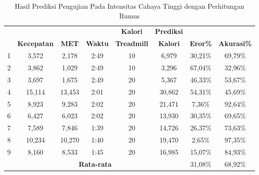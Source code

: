 \begin{longtable}{|c|c|c|c|c|c|c|c|}
  \caption{Hasil Prediksi Pengujian Pada Intensitas Cahaya Tinggi dengan Perhitungan Rumus}
  \label{tb:PengujianIntensitasTinggiAnalisaPrediksiPerhitungan}                                   \\
  \hline
  \rowcolor[HTML]{C0C0C0}
  & & & & \textbf{Kalori} & \textbf{Prediksi} & & \\
  \rowcolor[HTML]{C0C0C0}
  \multirow{-2}{*}{\textbf{Percobaan}} & \multirow{-2}{*}{\textbf{Kecepatan}} & \multirow{-2}{*}{\textbf{MET}} & \multirow{-2}{*}{\textbf{Waktu}} & \textbf{Treadmill} & \textbf{Kalori} & \multirow{-2}{*}{\textbf{Eror\%}} & \multirow{-2}{*}{\textbf{Akurasi\%}} \\
  \hline
  1   & 3,572   & 2,178    & 2:49    & 10   & 6,979   & 30,21\%     & 69,79\%   \\
  \hline
  2   & 3,862   & 1,029    & 2:49    & 10   & 3,296   & 67,04\%     & 32,96\%   \\
  \hline
  3   & 3,697   & 1,675    & 2:49    & 20   & 5,367   & 46,33\%     & 53,67\%   \\
  \hline
  4   & 15,114  & 13,453   & 2:01    & 20   & 30,862  & 54,31\%     & 45,69\%   \\
  \hline
  5   & 8,923   & 9,283    & 2:02    & 20   & 21,471  & 7,36\%      & 92,64\%   \\
  \hline
  6   & 6,427   & 6,023    & 2:02    & 20   & 13,930  & 30,35\%     & 69,65\%   \\
  \hline
  7   & 7,589   & 7,846    & 1:39    & 20   & 14,726  & 26,37\%     & 73,63\%   \\
  \hline
  8   & 10,234  & 10,270   & 1:40    & 20   & 19,470  & 2,65\%      & 97,35\%   \\
  \hline
  9   & 8,160   & 8,533    & 1:45    & 20   & 16,985  & 15,07\%     & 84,93\%   \\
  \hline

  \multicolumn{6}{|c|}{\textbf{Rata-rata}} & 31,08\% & 68,92\%  \\
  \hline
\end{longtable}

